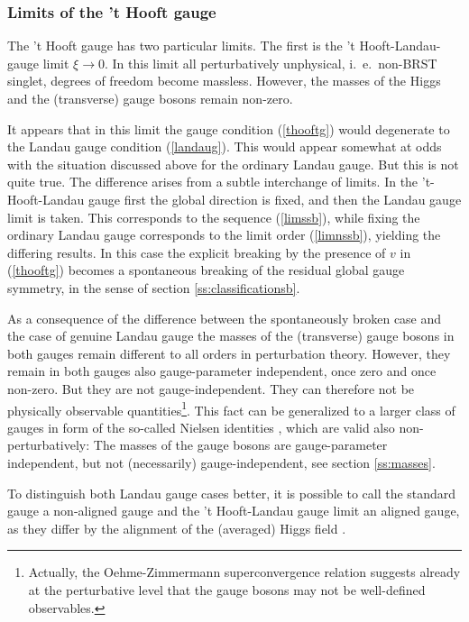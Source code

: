 \documentclass[final,12pt]{article}
\newcommand*{\pref}[1]{(\ref{#1})}
\newcommand*{\1}{1\!\!\!\bot}
\begin{document}
\subsubsection{Limits of the 't Hooft gauge}\label{ss:limitthooft}

The 't Hooft gauge has two particular limits. The first is the 't Hooft-Landau-gauge limit $\xi\to 0$. In this limit all perturbatively unphysical, i.\ e.\ non-BRST singlet, degrees of freedom become massless. However, the masses of the Higgs and the (transverse) gauge bosons remain non-zero.

It appears that in this limit the gauge condition \pref{thooftg} would degenerate to the Landau gauge condition \pref{landaug}. This would appear somewhat at odds with the situation discussed above for the ordinary Landau gauge. But this is not quite true. The difference arises from a subtle interchange of limits. In the 't-Hooft-Landau gauge first the global direction is fixed, and then the Landau gauge limit is taken. This corresponds to the sequence \pref{limssb}, while fixing the ordinary Landau gauge corresponds to the limit order \pref{limnssb}, yielding the differing results. In this case the explicit breaking by the presence of $v$ in \pref{thooftg} becomes a spontaneous breaking of the residual global gauge symmetry, in the sense of section \ref{ss:classificationsb}.

As a consequence of the difference between the spontaneously broken case and the case of genuine Landau gauge the masses of the (transverse) gauge bosons in both gauges remain different to all orders in perturbation theory. However, they remain in both gauges also gauge-parameter independent, once zero and once non-zero. But they are not gauge-independent. They can therefore not be physically observable quantities\footnote{Actually, the Oehme-Zimmermann superconvergence relation \cite{Oehme:1979ai} suggests already at the perturbative level that the gauge bosons may not be well-defined observables.}. This fact can be generalized to a larger class of gauges in form of the so-called Nielsen identities \cite{Nielsen:1975fs}, which are valid also non-perturbatively: The masses of the gauge bosons are gauge-parameter independent, but not (necessarily) gauge-independent, see section \ref{ss:masses}.

To distinguish both Landau gauge cases better, it is possible to call the standard gauge a non-aligned gauge and the 't Hooft-Landau gauge limit an aligned gauge, as they differ by the alignment of the (averaged) Higgs field \cite{Maas:2012ct}. 
\end{document}
